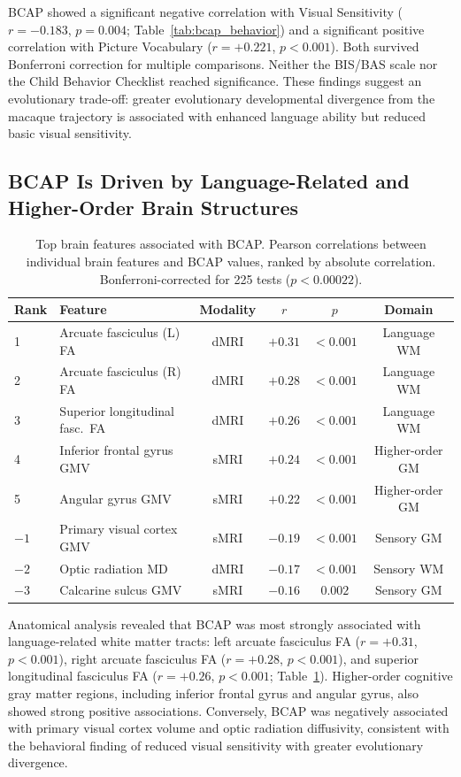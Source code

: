 \documentclass[11pt]{article}
\begin{document}
BCAP showed a significant negative correlation with Visual Sensitivity ($r = -0.183$, $p = 0.004$; Table~\ref{tab:bcap_behavior}) and a significant positive correlation with Picture Vocabulary ($r = +0.221$, $p < 0.001$). Both survived Bonferroni correction for multiple comparisons. Neither the BIS/BAS scale nor the Child Behavior Checklist reached significance. These findings suggest an evolutionary trade-off: greater evolutionary developmental divergence from the macaque trajectory is associated with enhanced language ability but reduced basic visual sensitivity.

\subsection{BCAP Is Driven by Language-Related and Higher-Order Brain Structures}

\begin{table}[H]
\centering
\caption{Top brain features associated with BCAP. Pearson correlations between individual brain features and BCAP values, ranked by absolute correlation. Bonferroni-corrected for 225 tests ($p < 0.00022$).}
\label{tab:bcap_anatomy}
\begin{tabular}{llcccc}
\toprule
Rank & Feature & Modality & $r$ & $p$ & Domain \\
\midrule
1 & Arcuate fasciculus (L) FA & dMRI & $+0.31$ & $< 0.001$ & Language WM \\
2 & Arcuate fasciculus (R) FA & dMRI & $+0.28$ & $< 0.001$ & Language WM \\
3 & Superior longitudinal fasc.\ FA & dMRI & $+0.26$ & $< 0.001$ & Language WM \\
4 & Inferior frontal gyrus GMV & sMRI & $+0.24$ & $< 0.001$ & Higher-order GM \\
5 & Angular gyrus GMV & sMRI & $+0.22$ & $< 0.001$ & Higher-order GM \\
\midrule
$-1$ & Primary visual cortex GMV & sMRI & $-0.19$ & $< 0.001$ & Sensory GM \\
$-2$ & Optic radiation MD & dMRI & $-0.17$ & $< 0.001$ & Sensory WM \\
$-3$ & Calcarine sulcus GMV & sMRI & $-0.16$ & $0.002$ & Sensory GM \\
\bottomrule
\end{tabular}
\end{table}

Anatomical analysis revealed that BCAP was most strongly associated with language-related white matter tracts: left arcuate fasciculus FA ($r = +0.31$, $p < 0.001$), right arcuate fasciculus FA ($r = +0.28$, $p < 0.001$), and superior longitudinal fasciculus FA ($r = +0.26$, $p < 0.001$; Table~\ref{tab:bcap_anatomy}). Higher-order cognitive gray matter regions, including inferior frontal gyrus and angular gyrus, also showed strong positive associations. Conversely, BCAP was negatively associated with primary visual cortex volume and optic radiation diffusivity, consistent with the behavioral finding of reduced visual sensitivity with greater evolutionary divergence.
\end{document}
